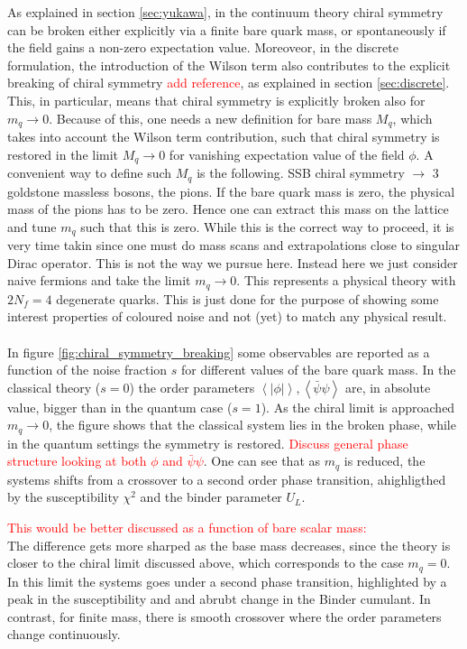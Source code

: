 As explained in section \ref{sec:yukawa}, in the continuum theory chiral symmetry can be broken either explicitly via a finite bare quark mass, or spontaneously if the field gains a non-zero expectation value. Moreoveor, in the discrete formulation, the introduction of the Wilson term also contributes to the explicit breaking of chiral symmetry \textcolor{red}{add reference}, as explained in section \ref{sec:discrete}. This, in particular, means that chiral symmetry is explicitly broken also for $m_q \to 0$. Because of this, one needs a new definition for bare mass $M_q$, which takes into account the Wilson term contribution, such that chiral symmetry is restored in the limit $M_q \to 0$ for vanishing expectation value of the field $\phi$. A convenient way to define such $M_q$ is the following. SSB chiral symmetry $\to$ 3 goldstone massless bosons, the pions. If the bare quark mass is zero, the physical mass of the pions has to be zero. Hence one can extract this mass on the lattice and tune $m_q$ such that this is zero. While this is the correct way to proceed, it is very time takin since one must do mass scans and extrapolations close to singular Dirac operator. This is not the way we pursue here. Instead here we just consider naive fermions and take the limit $m_q \to 0$. This represents a physical theory with $2N_f = 4$ degenerate quarks. This is just done for the purpose of showing some interest properties of coloured noise and not (yet) to match any physical result. \\~\\
In figure \ref{fig:chiral_symmetry_breaking} some observables are reported as a function of the noise fraction $s$ for different values of the bare quark mass. In the classical theory ($s=0$) the order parameters $\left\langle|\phi|\right\rangle, \left\langle\bar\psi \psi\right\rangle$ are, in absolute value, bigger than in the quantum case ($s=1$).  As the chiral limit is approached $m_q \to 0$, the figure shows that the classical system lies in the broken phase, while in the quantum settings the symmetry is restored. \textcolor{red}{Discuss general phase structure looking at both $\phi$ and $\bar\psi\psi$}. One can see that as $m_q$ is reduced, the systems shifts from a crossover to a second order phase transition, ahighligthed by the susceptibility $\chi^2$ and the binder parameter $U_L$.

\textcolor{red}{This would be better discussed as a function of bare scalar mass:} \\
The difference gets more sharped as the base mass decreases, since the theory is closer to the chiral limit discussed above, which corresponds to the case $m_q=0$. In this limit the systems goes under a second phase transition, highlighted by a peak in the susceptibility and and abrubt change in the Binder cumulant. In contrast, for finite mass,  there is smooth crossover where the order parameters change continuously.

